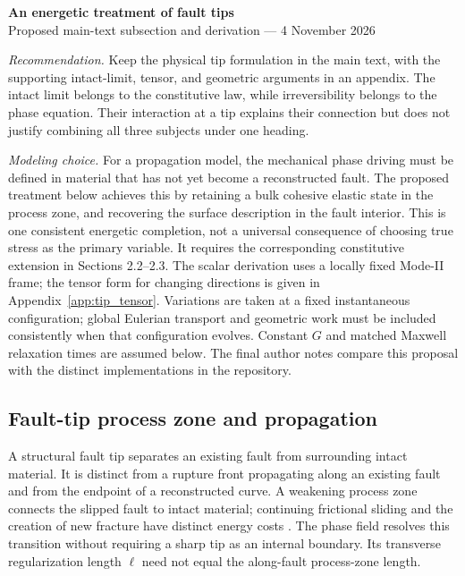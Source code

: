\documentclass[10pt,a4paper]{article}
\begin{document}
\begin{center}
{\large\bfseries An energetic treatment of fault tips}\\[3pt]
{\small Proposed main-text subsection and derivation --- 4 November 2026}
\end{center}

\textit{Recommendation.} Keep the physical tip formulation in the main text,
with the supporting intact-limit, tensor, and geometric arguments in an
appendix. The intact limit belongs to the constitutive law, while
irreversibility belongs to the phase equation. Their interaction at a tip
explains their connection but does not justify combining all three subjects
under one heading.

\textit{Modeling choice.} For a propagation model, the mechanical phase driving
must be defined in material that has not yet become a reconstructed fault.
The proposed treatment below achieves this by retaining a bulk cohesive elastic
state in the process zone, and recovering the surface description in the
fault interior. This is one consistent energetic completion, not a universal
consequence of choosing true stress as the primary variable. It requires the
corresponding constitutive extension in Sections 2.2--2.3. The scalar derivation
uses a locally fixed Mode-II frame; the tensor form for changing directions is
given in Appendix~\ref{app:tip_tensor}. Variations are taken at a fixed
instantaneous configuration; global Eulerian transport and geometric work must
be included consistently when that configuration evolves. Constant $G$ and
matched Maxwell relaxation times are assumed below. The final author notes
compare this proposal with the distinct implementations in the repository.

\setcounter{section}{2}
\setcounter{subsection}{3}
\subsection{Fault-tip process zone and propagation}
\label{sect:fault_tips}

A structural fault tip separates an existing fault from surrounding intact
material. It is distinct from a rupture front propagating along an existing
fault and from the endpoint of a reconstructed curve. A weakening process zone
connects the slipped fault to intact material; continuing frictional sliding
and the creation of new fracture have distinct energy costs
\citep{FeiChoo2020Shear}. The phase field resolves this transition without
requiring a sharp tip as an internal boundary. Its transverse regularization
length $\ell$ need not equal the along-fault process-zone length.
\end{document}
